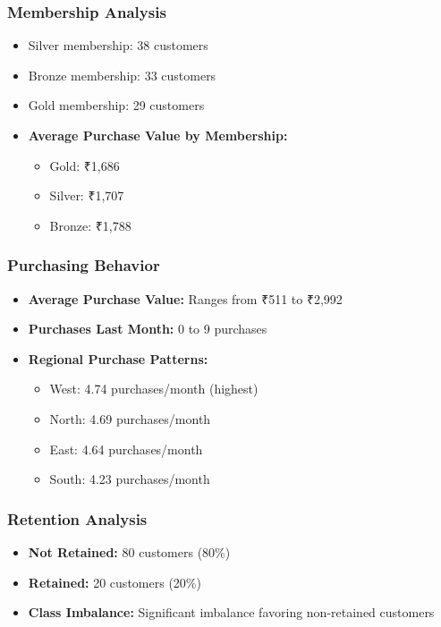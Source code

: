 \documentclass[12pt,a4paper]{article}
\begin{document}
\subsubsection{Membership Analysis}
\begin{itemize}
    \item Silver membership: 38 customers
    \item Bronze membership: 33 customers
    \item Gold membership: 29 customers
    \item \textbf{Average Purchase Value by Membership:}
    \begin{itemize}
        \item Gold: ₹1,686
        \item Silver: ₹1,707
        \item Bronze: ₹1,788
    \end{itemize}
\end{itemize}

\subsubsection{Purchasing Behavior}
\begin{itemize}
    \item \textbf{Average Purchase Value:} Ranges from ₹511 to ₹2,992
    \item \textbf{Purchases Last Month:} 0 to 9 purchases
    \item \textbf{Regional Purchase Patterns:}
    \begin{itemize}
        \item West: 4.74 purchases/month (highest)
        \item North: 4.69 purchases/month
        \item East: 4.64 purchases/month
        \item South: 4.23 purchases/month
    \end{itemize}
\end{itemize}

\subsubsection{Retention Analysis}
\begin{itemize}
    \item \textbf{Not Retained:} 80 customers (80\%)
    \item \textbf{Retained:} 20 customers (20\%)
    \item \textbf{Class Imbalance:} Significant imbalance favoring non-retained customers
\end{itemize}
\end{document}
